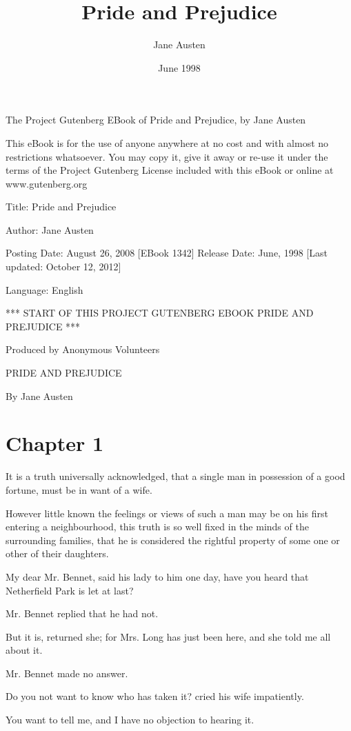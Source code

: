 \documentclass{article}
\title{Pride and Prejudice}
\author{Jane Austen}
\date{June 1998}
\begin{document}
\maketitle

The Project Gutenberg EBook of Pride and Prejudice, by Jane Austen

This eBook is for the use of anyone anywhere at no cost and with
almost no restrictions whatsoever.  You may copy it, give it away or
re-use it under the terms of the Project Gutenberg License included
with this eBook or online at www.gutenberg.org


Title: Pride and Prejudice

Author: Jane Austen

Posting Date: August 26, 2008 [EBook 1342]
Release Date: June, 1998
[Last updated: October 12, 2012]

Language: English


*** START OF THIS PROJECT GUTENBERG EBOOK PRIDE AND PREJUDICE ***




Produced by Anonymous Volunteers





PRIDE AND PREJUDICE

By Jane Austen

\section{Chapter 1}


It is a truth universally acknowledged, that a single man in possession
of a good fortune, must be in want of a wife.

However little known the feelings or views of such a man may be on his
first entering a neighbourhood, this truth is so well fixed in the minds
of the surrounding families, that he is considered the rightful property
of some one or other of their daughters.

My dear Mr. Bennet, said his lady to him one day, have you heard that
Netherfield Park is let at last?

Mr. Bennet replied that he had not.

But it is, returned she; for Mrs. Long has just been here, and she
told me all about it.

Mr. Bennet made no answer.

Do you not want to know who has taken it? cried his wife impatiently.

You want to tell me, and I have no objection to hearing it.
\end{document}
